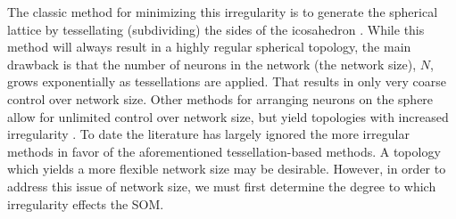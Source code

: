 The classic method for minimizing this irregularity is to generate
the spherical lattice by tessellating (subdividing) the sides of the icosahedron
\cite{Nishio:2006fk}.  While this method will always result in a highly
regular spherical topology, the main drawback is that the number of neurons in
the network (the network size), \(N\), grows exponentially as tessellations are
applied. That results in only very coarse control over network size.
 Other methods for arranging neurons on the sphere allow
for unlimited control over network size, but yield topologies with increased
irregularity \cite{harris2000, wu2005, Nishio:2006fk}.  To date the
literature has largely ignored the more irregular methods in favor of the
aforementioned tessellation-based methods.  A topology which yields a more flexible network
size may be desirable.  However, in order to address this issue of network
size, we must first determine the degree to which irregularity effects the
SOM.


